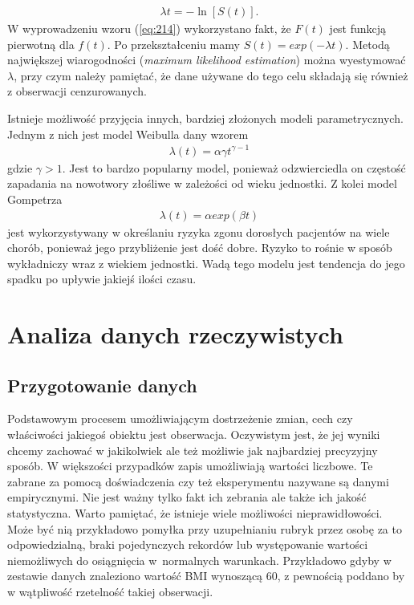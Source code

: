 \documentclass[licencjacka]{pwr_wmat_praca_dyplomowa}
\theoremstyle{plain}
\numberwithin{theorem}{chapter}
\theoremstyle{definition}
\numberwithin{theorem}{chapter}
\begin{document}
\begin{align}
\lambda t = - \ln [S(t)]. \label{eq:214}
\end{align}
W wyprowadzeniu wzoru (\ref{eq:214})  wykorzystano fakt, że $F(t)$ jest funkcją pierwotną dla $f(t)$. Po przekształceniu mamy $S(t)=exp(-\lambda t)$. Metodą największej wiarogodności (\textit{maximum likelihood estimation}) można wyestymować $\lambda$, przy czym należy pamiętać, że dane używane do tego celu składają się również z obserwacji cenzurowanych.

Istnieje możliwość przyjęcia innych, bardziej złożonych modeli parametrycznych. Jednym z nich jest model Weibulla dany wzorem \cite{smimr}
\begin{align}
\lambda (t)= \alpha \gamma t^{\gamma -1}
\end{align}
gdzie $\gamma>1$. Jest to bardzo popularny model, ponieważ odzwierciedla on częstość zapadania na nowotwory złośliwe w zależości od wieku jednostki. Z kolei model Gompetrza \cite{smimr}
\begin{align}
\lambda (t)= \alpha exp(\beta t) 
\end{align}
jest wykorzystywany w określaniu ryzyka zgonu dorosłych pacjentów na wiele chorób, ponieważ jego przybliżenie jest dość dobre. Ryzyko to rośnie w sposób wykładniczy wraz z wiekiem jednostki.  Wadą tego modelu jest tendencja do jego spadku po upływie jakiejś ilości czasu.


\chapter{Analiza danych rzeczywistych}\label{analizadanychrzeczywistych}
\section{Przygotowanie danych}

Podstawowym procesem umożliwiającym dostrzeżenie zmian, cech czy właściwości jakiegoś obiektu jest obserwacja. Oczywistym jest, że jej wyniki chcemy zachować w jakikolwiek ale też możliwie jak najbardziej precyzyjny sposób. W większości przypadków zapis umożliwiają wartości liczbowe. Te zabrane za pomocą doświadczenia czy też eksperymentu nazywane są danymi empirycznymi. Nie jest ważny tylko fakt ich zebrania ale także ich jakość statystyczna. Warto pamiętać, że istnieje wiele możliwości nieprawidłowości. Może być nią przykładowo pomyłka przy uzupełnianiu rubryk przez osobę za to odpowiedzialną, braki pojedynczych rekordów lub występowanie wartości niemożliwych do osiągnięcia w~normalnych warunkach. Przykładowo gdyby w zestawie danych znaleziono wartość BMI wynoszącą 60, z pewnością poddano by w wątpliwość rzetelność takiej obserwacji.
\end{document}
